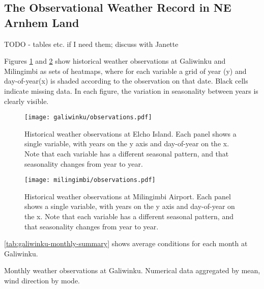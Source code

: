 \subsection{The Observational Weather Record in NE Arnhem Land}
TODO - tables etc. if I need them; discuss with Janette

Figures \ref{fig:galiwinku-observations} and \ref{fig:milingimbi-observations}
show historical weather observations at Galiwinku and Milingimbi as
sets of heatmaps, where for each variable a grid of year (y) and day-of-year(x)
is shaded according to the observation on that date.
Black cells indicate missing data.
In each figure, the variation in seasonality between years is clearly visible.


\begin{figure}[p]
    \centering
    \texttt{[image: galiwinku/observations.pdf]}
    \caption[Historical weather observations at Elcho Island]{
        Historical weather observations at Elcho Island.
        Each panel shows a single variable, with years on the y axis and day-of-year on the x.
        Note that each variable has a different seasonal pattern,
        and that seasonality changes from year to year.}
    \label{fig:galiwinku-observations}
\end{figure}
\begin{figure}[p]
    \centering
    \texttt{[image: milingimbi/observations.pdf]}
    \caption[Historical weather observations at Milingimbi Airport]{
        Historical weather observations at Milingimbi Airport.
        Each panel shows a single variable, with years on the y axis and day-of-year on the x.
        Note that each variable has a different seasonal pattern,
        and that seasonality changes from year to year.}
    \label{fig:milingimbi-observations}
\end{figure}


\autoref{tab:galiwinku-monthly-summary} shows average conditions for each
month at Galiwinku.

\begin{landscape}
\begin{table}
    
    \caption{Monthly weather observations at Galiwinku.
        Numerical data aggregated by mean, wind direction by mode.}
    \label{tab:galiwinku-monthly-summary}
\end{table}
\end{landscape}



